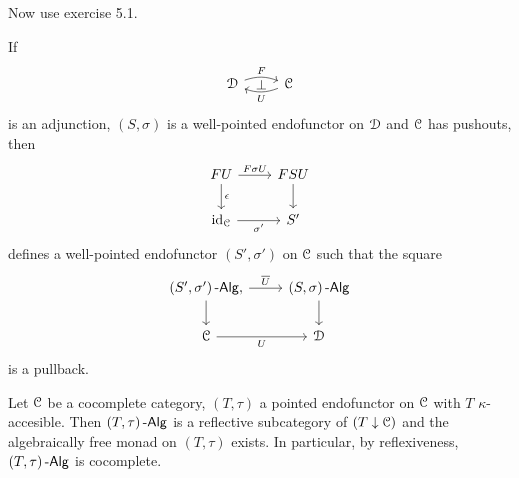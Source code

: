 \documentclass[a4paper,11pt,oneside,openany]{scrbook}
\begin{document}
Now use exercise 5.1.
\begin{prop}
	If
	\begin{displaymath}
		\begin{tikzcd}
			\D \arrow[r, "F", bend left=20]
			\arrow[from=r, "U", bend left=20]
			\arrow[r, phantom, "\bot"]
			& \C
		\end{tikzcd}
	\end{displaymath}
	is an adjunction, $ (S,\sigma) $ is a well-pointed endofunctor on $ \operatorname{\mathcal{D}} $
	and $ \operatorname{\mathcal{C}} $ has pushouts, then
	\begin{displaymath}
		\begin{tikzcd}
			FU \arrow[r,"F\sigma U"]\arrow[d, "\epsilon"]& FSU \arrow[d]\\
			\id_{\C} \arrow[r, "\sigma'"']& S'
		\end{tikzcd}
	\end{displaymath}
	defines a well-pointed endofunctor $ (S',\sigma') $ on $ \operatorname{\mathcal{C}} $ such that the square
	\begin{displaymath}
		\begin{tikzcd}
			(S',\sigma')\Alg \arrow[r, "\overline U"],\arrow[d]
			& (S,\sigma)\Alg \arrow[d]\\
			\C \arrow[r, "U"'] & \D
		\end{tikzcd}
	\end{displaymath}
	is a pullback.\hfill\qedsymbol
\end{prop}
\begin{thm}
	Let $ \operatorname{\mathcal{C}} $ be a cocomplete category, $ (T,\tau) $ a pointed endofunctor on $ \operatorname{\mathcal{C}} $ with $ T $ $ \kappa $-accesible.
	Then $ (T,\tau)\operatorname{-\mathsf{Alg}} $ is a reflective subcategory of $ (T\downarrow\operatorname{\mathcal{C}})$ and the algebraically free monad on $ (T,\tau) $ exists. In particular, by reflexiveness, $ (T,\tau)\operatorname{-\mathsf{Alg}} $ is cocomplete.
\end{thm}
\end{document}
